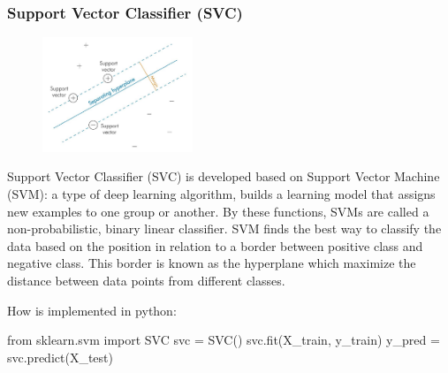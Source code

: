 \documentclass{article}
\begin{document}
\subsubsection*{Support Vector Classifier (SVC)}
\begin{multicols}{2}
\begin{figure}[H]
        \begin{center}
        \includegraphics[width=0.4\textwidth]{SVC.jpeg}
        \end{center}
    \end{figure} 
    \columnbreak
\columnbreak
Support Vector Classifier (SVC) is developed based on Support Vector Machine (SVM): a type of deep learning algorithm, builds a learning model that assigns new examples to one group or another. By these functions, SVMs are called a non-probabilistic, binary linear classifier. SVM finds the best way to classify the data based on the position in relation to a border between positive class and negative class. This border is known as the hyperplane which maximize the distance between data points from different classes.
\end{multicols}
\begin{center}
How is implemented in python:
\begin{Python}
from sklearn.svm import SVC
svc = SVC()
svc.fit(X_train, y_train)
y_pred = svc.predict(X_test)
\end{Python}
\end{center}


\newpage
\end{document}
